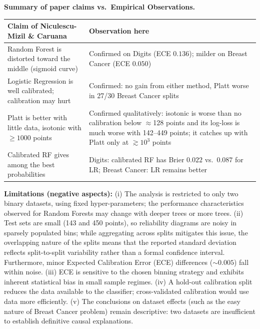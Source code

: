 \documentclass[11pt,a4paper]{article}
\begin{document}
\textbf{Summary of paper claims vs.\ Empirical Observations.}
\begin{center}\small
\begin{tabular}{p{5.0cm}p{9.6cm}}\toprule
Claim of Niculescu-Mizil \& Caruana & Observation here\\\midrule
Random Forest is distorted toward the middle (sigmoid curve) & Confirmed on Digits (ECE $0.136$); milder on Breast Cancer (ECE $0.050$)\\
Logistic Regression is well calibrated; calibration may hurt & Confirmed: no gain from either method, Platt worse in 27/30 Breast Cancer splits\\
Platt is better with little data, isotonic with $\ge1000$ points & Confirmed qualitatively: isotonic is worse than no calibration below $\approx$128 points and its log-loss is much worse with 142--449 points; it catches up with Platt only at $\gtrsim10^3$ points\\
Calibrated RF gives among the best probabilities & Digits: calibrated RF has Brier $0.022$ vs.\ $0.087$ for LR; Breast Cancer: LR remains better\\\bottomrule
\end{tabular}
\end{center}

\textbf{Limitations (negative aspects):} (i) The analysis is restricted to only two binary datasets, using fixed hyper-parameters; the performance characteristics observed for Random Forests may change with deeper trees or more trees. (ii) Test sets are small (143 and 450 points), so reliability diagrams are noisy in sparsely populated bins; while aggregating across splits mitigates this issue, the overlapping nature of the splits means that the reported standard deviation reflects split-to-split variability rather than a formal confidence interval. Furthermore, minor Expected Calibration Error (ECE) differences ($\sim0.005$) fall within noise. (iii) ECE is sensitive to the chosen binning strategy and exhibits inherent statistical bias in small sample regimes. (iv) A hold-out calibration split reduces the data available to the classifier; cross-validated calibration would use data more efficiently. (v) The conclusions on dataset effects (such as the easy nature of Breast Cancer problem) remain descriptive: two datasets are insufficient to establish definitive causal explanations.
\end{document}
